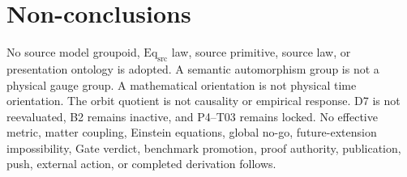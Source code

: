 \documentclass[11pt]{article}
\newcommand{\EqSrc}{\ensuremath{\mathrm{Eq}_{\mathrm{src}}}}
\begin{document}
\section{Non-conclusions}

No source model groupoid, \EqSrc{} law, source primitive, source law, or
presentation ontology is adopted.  A semantic automorphism group is not a
physical gauge group.  A mathematical orientation is not physical time
orientation.  The orbit quotient is not causality or empirical response.  D7
is not reevaluated, B2 remains inactive, and P4--T03 remains locked.  No
effective metric, matter coupling, Einstein equations, global no-go,
future-extension impossibility, Gate verdict, benchmark promotion, proof
authority, publication, push, external action, or completed derivation
follows.
\end{document}
